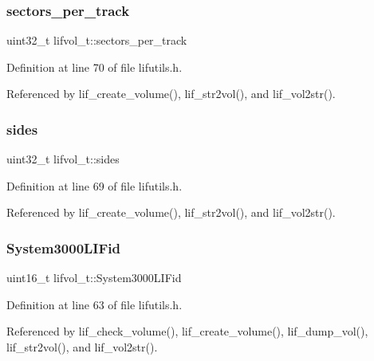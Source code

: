 \subsubsection{\texorpdfstring{sectors\+\_\+per\+\_\+track}{sectors\_per\_track}}
{\footnotesize\ttfamily uint32\+\_\+t lifvol\+\_\+t\+::sectors\+\_\+per\+\_\+track}



Definition at line 70 of file lifutils.\+h.



Referenced by lif\+\_\+create\+\_\+volume(), lif\+\_\+str2vol(), and lif\+\_\+vol2str().

\mbox{\label{structlifvol__t_a5b8ecfb441b010f69cb90b923cc50719}} 
\subsubsection{\texorpdfstring{sides}{sides}}
{\footnotesize\ttfamily uint32\+\_\+t lifvol\+\_\+t\+::sides}



Definition at line 69 of file lifutils.\+h.



Referenced by lif\+\_\+create\+\_\+volume(), lif\+\_\+str2vol(), and lif\+\_\+vol2str().

\mbox{\label{structlifvol__t_a98097f8c951448cbab6019b7b703e4d0}} 
\subsubsection{\texorpdfstring{System3000\+L\+I\+Fid}{System3000LIFid}}
{\footnotesize\ttfamily uint16\+\_\+t lifvol\+\_\+t\+::\+System3000\+L\+I\+Fid}



Definition at line 63 of file lifutils.\+h.



Referenced by lif\+\_\+check\+\_\+volume(), lif\+\_\+create\+\_\+volume(), lif\+\_\+dump\+\_\+vol(), lif\+\_\+str2vol(), and lif\+\_\+vol2str().

\mbox{\label{structlifvol__t_aae9e5135f98b80312eb785ac3747fc31}} 
